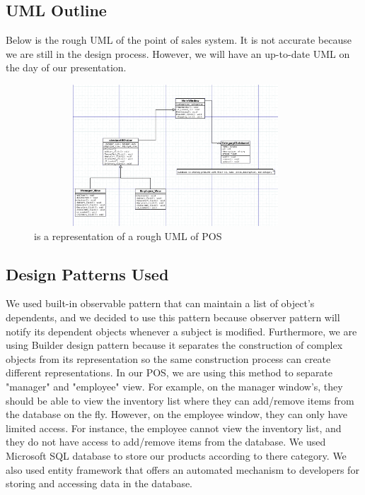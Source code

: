 \documentclass[10pt,conference,onecolumn,compsoc]{IEEEtran}
\begin{document}
\subsection{UML Outline}
Below is the rough UML of the point of sales system. It is not accurate because we are still in the design process. However, we will have an up-to-date UML on the day of our presentation. 


\begin{figure}[H]
\includegraphics[height=200px, width=400px]{uml}
\caption{is a  representation of a rough UML of POS}
\label{fullPT}
\end{figure}




\subsection{Design Patterns Used}
We used built-in observable pattern that can maintain a list of object's dependents, and we decided to use this pattern because observer pattern will notify its dependent objects whenever a subject is modified.  Furthermore, we are using Builder design pattern because it separates the construction of complex objects from its representation so the same construction process can create different representations. In our POS, we are using this method to separate "manager" and "employee" view. For example, on the manager window's, they should be able to view the inventory list where they can add/remove items from the database on the fly. However, on the employee window, they can only have limited access. For instance, the employee cannot view the inventory list, and they do not have access to add/remove items from the database. We used Microsoft SQL database to store our products according to there category. We also used entity framework that offers an automated mechanism to developers for storing and accessing data in the database. 
\end{document}
